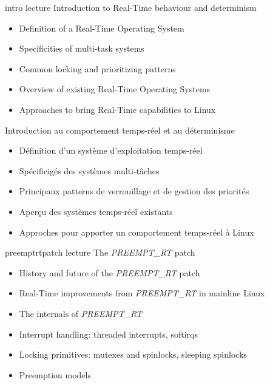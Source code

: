 
\def \trainers {
  \href{https://bootlin.com/company/staff/maxime-chevallier/}{Maxime Chevallier}
}

\def \onsitelecturetimeratio{50}
\def \onsitelabtimeratio{50}


{intro}
{lecture}
{Introduction to Real-Time behaviour and determinism}
{
  \begin{itemize}
  \item Definition of a Real-Time Operating System
  \item Specificities of multi-task systems
  \item Common locking and prioritizing patterns
  \item Overview of existing Real-Time Operating Systems
  \item Approaches to bring Real-Time capabilities to Linux
  \end{itemize}
}
{Introduction au comportement temps-réel et au déterminisme}
{
  \begin{itemize}
  \item Définition d'un système d'exploitation temps-réel
  \item Spécificigés des systèmes multi-tâches
  \item Principaux patterns de verrouillage et de gestion des priorités
  \item Aperçu des systèmes temps-réel existants
  \item Approches pour apporter un comportement temps-réel à Linux
  \end{itemize}
}
{preemptrtpatch}
{lecture}
{The {\em PREEMPT\_RT} patch}
{
  \begin{itemize}
  \item History and future of the {\em PREEMPT\_RT} patch
  \item Real-Time improvements from {\em PREEMPT\_RT} in mainline Linux
  \item The internals of {\em PREEMPT\_RT}
  \item Interrupt handling: threaded interrupts, softirqs
  \item Locking primitives: mutexes and spinlocks, sleeping spinlocks
  \item Preemption models
  \end{itemize}
}
